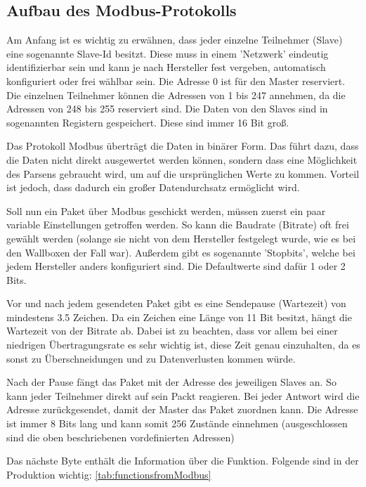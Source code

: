 \subsection{Aufbau des Modbus-Protokolls}
Am Anfang ist es wichtig zu erwähnen, dass jeder einzelne Teilnehmer (Slave) eine sogenannte Slave-Id besitzt. Diese muss in einem 'Netzwerk' eindeutig identifizierbar sein und kann je nach Hersteller fest vergeben, automatisch konfiguriert oder frei wählbar sein. Die Adresse 0 ist für den Master reserviert. Die einzelnen Teilnehmer können die Adressen von 1 bis 247 annehmen, da die Adressen von 248 bis 255 reserviert sind. Die Daten von den Slaves sind in sogenannten Registern gespeichert. Diese sind immer 16 Bit groß.


Das Protokoll Modbus überträgt die Daten in binärer Form. Das führt dazu, dass die Daten nicht direkt ausgewertet werden können, sondern dass eine Möglichkeit des Parsens gebraucht wird, um auf die ursprünglichen Werte zu kommen. Vorteil ist jedoch, dass dadurch ein großer Datendurchsatz ermöglicht wird.




Soll nun ein Paket über Modbus geschickt werden, müssen zuerst ein paar variable Einstellungen getroffen werden. So kann die Baudrate (Bitrate) oft frei gewählt werden (solange sie nicht von dem Hersteller festgelegt wurde, wie es bei den Wallboxen der Fall war). Außerdem gibt es sogenannte 'Stopbits', welche bei jedem Hersteller anders konfiguriert sind. Die Defaultwerte sind dafür 1 oder 2 Bits.





Vor und nach jedem gesendeten Paket gibt es eine Sendepause (Wartezeit) von mindestens 3.5 Zeichen. Da ein Zeichen eine Länge von 11 Bit besitzt, hängt die Wartezeit von der Bitrate ab. Dabei ist zu beachten, dass vor allem bei einer niedrigen Übertragungsrate es sehr wichtig ist, diese Zeit genau einzuhalten, da es sonst zu Überschneidungen und zu Datenverlusten kommen würde.



Nach der Pause fängt das Paket mit der Adresse des jeweiligen Slaves an. So kann jeder Teilnehmer direkt auf sein Packt reagieren. Bei jeder Antwort wird die Adresse zurückgesendet, damit der Master das Paket zuordnen kann. Die Adresse ist immer 8 Bits lang und kann somit 256 Zustände einnehmen (ausgeschlossen sind die oben beschriebenen vordefinierten Adressen)



Das nächste Byte enthält die Information über die Funktion. Folgende sind in der Produktion wichtig: \ref{tab:functionsfromModbus}


